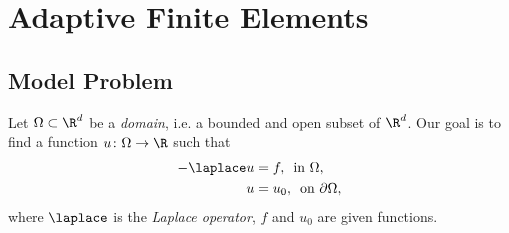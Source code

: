 
\chapter{Adaptive Finite Elements}
\section{Model Problem}
Let $\Omega\subset\R^d$ be a \textit{domain}, i.e. a bounded and open subset of $\R^d$. Our goal is to find a function $u\colon\Omega\to\R$ such that 
\begin{align*}
    -\laplace u & = f,\,\text{ in } \Omega, \\
    u & =u_0,\,\text{ on } \partial\Omega,
\end{align*}
where $\laplace$ is the \emph{Laplace operator}, $f$ and $u_0$ are given functions.
